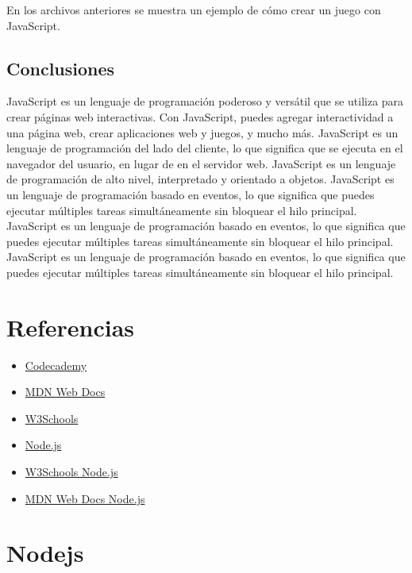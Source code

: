 \documentclass[
  a4paper,
  DIV=11,
  numbers=noendperiod,
  onepage,
  openany]{scrreprt}
\providecommand{\tightlist}{%
  \setlength{\itemsep}{0pt}\setlength{\parskip}{0pt}}\usepackage{longtable,booktabs,array}
\begin{document}
En los archivos anteriores se muestra un ejemplo de cómo crear un juego
con JavaScript.

\section{Conclusiones}\label{conclusiones}

JavaScript es un lenguaje de programación poderoso y versátil que se
utiliza para crear páginas web interactivas. Con JavaScript, puedes
agregar interactividad a una página web, crear aplicaciones web y
juegos, y mucho más. JavaScript es un lenguaje de programación del lado
del cliente, lo que significa que se ejecuta en el navegador del
usuario, en lugar de en el servidor web. JavaScript es un lenguaje de
programación de alto nivel, interpretado y orientado a objetos.
JavaScript es un lenguaje de programación basado en eventos, lo que
significa que puedes ejecutar múltiples tareas simultáneamente sin
bloquear el hilo principal. JavaScript es un lenguaje de programación
basado en eventos, lo que significa que puedes ejecutar múltiples tareas
simultáneamente sin bloquear el hilo principal. JavaScript es un
lenguaje de programación basado en eventos, lo que significa que puedes
ejecutar múltiples tareas simultáneamente sin bloquear el hilo
principal.

\chapter{Referencias}\label{referencias-2}

\begin{itemize}
\tightlist
\item
  \href{https://www.codecademy.com/learn/introduction-to-javascript}{Codecademy}
\item
  \href{https://developer.mozilla.org/en-US/docs/Web/JavaScript}{MDN Web
  Docs}
\item
  \href{https://www.w3schools.com/js/default.asp}{W3Schools}
\item
  \href{https://nodejs.org/en/docs/}{Node.js}
\item
  \href{https://www.w3schools.com/nodejs/default.asp}{W3Schools Node.js}
\item
  \href{https://developer.mozilla.org/en-US/docs/Learn/Server-side/Nodejs}{MDN
  Web Docs Node.js}
\end{itemize}

\chapter{Nodejs}\label{nodejs}
\end{document}
